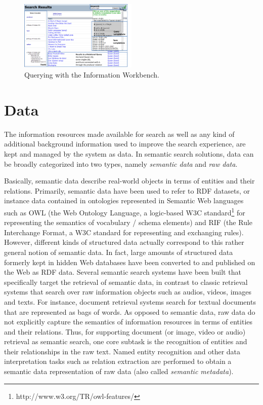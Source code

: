 \begin{figure}
	\centering
		\includegraphics[width=0.5\textwidth]{figs/screenshot_iwb}
	\caption{Querying with the Information Workbench.}
	\label{fig:screenshot_iwb}
\end{figure}




\section{Data}\label{sec:data}
The information resources made available for search as well as any kind of additional background information used to improve the search experience, are kept and managed by the system as data. In semantic search solutions, data can be broadly categorized into two types, namely \emph{semantic data} and \emph{raw data}. 

Basically, semantic data describe real-world objects in terms of entities and their relations. Primarily, semantic data have been used to refer to RDF datasets, or instance data contained in ontologies represented in Semantic Web languages such as OWL (the Web Ontology Language, a logic-based W3C standard\footnote{http://www.w3.org/TR/owl-features/} for representing the semantics of vocabulary / schema elements) and RIF (the Rule Interchange Format, a W3C standard for representing and exchanging rules). However, different kinds of structured data actually correspond to this rather general notion of semantic data. In fact, large amounts of structured data formerly kept in hidden 
Web databases 
have been converted to and published on the Web as RDF data. Several semantic search systems have been built that specifically target the retrieval of semantic data,  in contrast to classic retrieval systems that search over raw information objects such as audios, videos, images and texts. For instance, document retrieval systems search for textual documents that are represented as bags of words. As opposed to semantic data, raw data do not explicitly capture the semantics of information resources in terms of entities and their relations. Thus, for supporting document (or image, video or audio) retrieval as semantic search, one core subtask is the recognition of entities and their relationships in the raw text. Named entity recognition and other data interpretation tasks such as relation extraction are performed to obtain a semantic data representation of raw data (also called \emph{semantic metadata}). 


